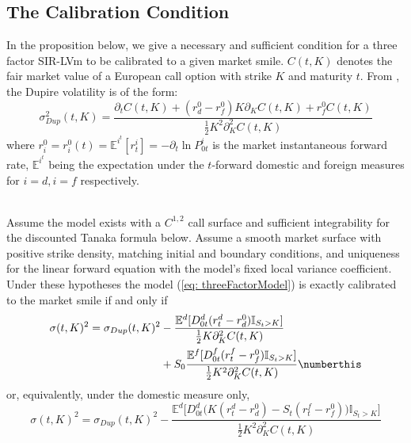 \subsection{The Calibration Condition}
In the proposition below, we give a necessary and sufficient condition for a three factor SIR-LVm to be calibrated to a given market smile. $C(t,K)$ denotes the fair market value of a European call option with strike $K$ and maturity $t$.
From \cite{deelstraRayee}, the Dupire volatility is of the form:
\begin{equation}\label{eq: threeFactorDupireVolatility}
\sigma_{Dup}^2(t,K) =
\frac{  \partial_t C(t,K) + (r_d^0 - r_f^0)K\partial_K C(t,K)+ r_f^0 C(t,K)}
{ \frac{1}{2}K^2\partial^2_K C(t,K) }
\end{equation}
where $r_i^0 = r_i^0(t)= \mathbb{E}^{i^t} [r^i_t] = -\partial_t\ln P^{i}_{0t}$ is the market instantaneous forward rate, $\mathbb{E}^{i^t}$ being the expectation under the $t$-forward domestic and foreign measures for $i = d, i=f$ respectively.

\begin{prop}\label{prop: calibration}\ \\
Assume the model exists with a $C^{1,2}$ call surface and sufficient
integrability for the discounted Tanaka formula below. Assume a smooth market
surface with positive strike density, matching initial and boundary conditions,
and uniqueness for the linear forward equation with the model's fixed local
variance coefficient. Under these hypotheses the model
(\ref{eq: threeFactorModel}) is exactly calibrated to the market smile if and only if
\begin{align*}
\sigma(t,K)^2 = \sigma_{Dup}(t,K)^2 & - \frac{ \mathbb{E}^d[ D_{0t}^d(r_t^d-r^0_d)\mathbb{I}_{S_t>K} ]}{ \frac{1}{2}K\partial^2_KC(t,K) }\\
 &+ S_0\frac{ \mathbb{E}^f[ D_{0t}^f(r_t^f-r^0_f)\mathbb{I}_{S_t>K} ]}{ \frac{1}{2}K^2\partial^2_KC(t,K) }\numberthis \label{eq: threeFactorCalibrationCondition}
\end{align*}
or, equivalently, under the domestic measure only,
\begin{equation}\label{eq: singleMeasure}
\sigma(t,K)^2 = \sigma_{Dup}(t,K)^2 - \frac{ \mathbb{E}^d\big[ D_{0t}^d\big(K(r_t^d-r^0_d)-S_t(r_t^f-r^0_f)\big)\mathbb{I}_{S_t>K} \big]}{ \frac{1}{2}K^2\partial^2_KC(t,K) }
\end{equation}
\end{prop}

